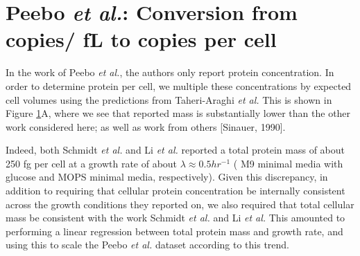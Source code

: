\section{Peebo {\it et al.}: Conversion from copies/ fL to copies per cell}

In the work of Peebo {\it et al.}, the authors only report protein
concentration. In order to determine protein per cell, we multiple these
concentrations by expected cell volumes  using the predictions from
Taheri-Araghi {\it et al.} This is shown in Figure \ref{}A, where we see that
reported mass is substantially lower than the other work considered here; as
well as work from others [Sinauer, 1990].

Indeed, both Schmidt {\it et al.} and Li {\it et al.} reported a total protein
mass of about 250 fg per cell at a growth rate of about $\lambda \approx 0.5
hr^{-1}$ ( M9 minimal media with glucose and MOPS minimal media, respectively).
Given this discrepancy, in addition to requiring that cellular protein
concentration be internally consistent across the growth conditions they
reported on, we also required that total cellular mass be consistent with the
work Schmidt {\it et al.} and Li {\it et al.} This amounted to performing a
linear regression between total protein mass and growth rate, and using this to
scale the Peebo {\it et al.} dataset according to this trend.
